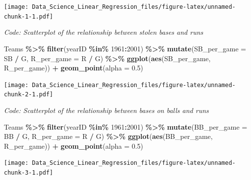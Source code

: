 \documentclass[
]{article}
\newenvironment{Shaded}{\begin{snugshade}}{\end{snugshade}}
\newcommand{\DataTypeTok}[1]{\textcolor[rgb]{0.13,0.29,0.53}{#1}}
\newcommand{\DecValTok}[1]{\textcolor[rgb]{0.00,0.00,0.81}{#1}}
\newcommand{\FloatTok}[1]{\textcolor[rgb]{0.00,0.00,0.81}{#1}}
\newcommand{\KeywordTok}[1]{\textcolor[rgb]{0.13,0.29,0.53}{\textbf{#1}}}
\newcommand{\NormalTok}[1]{#1}
\newcommand{\OperatorTok}[1]{\textcolor[rgb]{0.81,0.36,0.00}{\textbf{#1}}}
\newcommand{\StringTok}[1]{\textcolor[rgb]{0.31,0.60,0.02}{#1}}
\begin{document}
\texttt{[image: Data\_Science\_Linear\_Regression\_files/figure-latex/unnamed-chunk-1-1.pdf]}

\emph{Code: Scatterplot of the relationship between stolen bases and
runs}

\begin{Shaded}
\begin{Highlighting}[]
\NormalTok{Teams }\OperatorTok{\%\textgreater{}\%}\StringTok{ }\KeywordTok{filter}\NormalTok{(yearID }\OperatorTok{\%in\%}\StringTok{ }\DecValTok{1961}\OperatorTok{:}\DecValTok{2001}\NormalTok{) }\OperatorTok{\%\textgreater{}\%}
\StringTok{    }\KeywordTok{mutate}\NormalTok{(}\DataTypeTok{SB\_per\_game =}\NormalTok{ SB }\OperatorTok{/}\StringTok{ }\NormalTok{G, }\DataTypeTok{R\_per\_game =}\NormalTok{ R }\OperatorTok{/}\StringTok{ }\NormalTok{G) }\OperatorTok{\%\textgreater{}\%}
\StringTok{    }\KeywordTok{ggplot}\NormalTok{(}\KeywordTok{aes}\NormalTok{(SB\_per\_game, R\_per\_game)) }\OperatorTok{+}\StringTok{ }
\StringTok{    }\KeywordTok{geom\_point}\NormalTok{(}\DataTypeTok{alpha =} \FloatTok{0.5}\NormalTok{)}
\end{Highlighting}
\end{Shaded}

\texttt{[image: Data\_Science\_Linear\_Regression\_files/figure-latex/unnamed-chunk-2-1.pdf]}

\emph{Code: Scatterplot of the relationship between bases on balls and
runs}

\begin{Shaded}
\begin{Highlighting}[]
\NormalTok{Teams }\OperatorTok{\%\textgreater{}\%}\StringTok{ }\KeywordTok{filter}\NormalTok{(yearID }\OperatorTok{\%in\%}\StringTok{ }\DecValTok{1961}\OperatorTok{:}\DecValTok{2001}\NormalTok{) }\OperatorTok{\%\textgreater{}\%}
\StringTok{    }\KeywordTok{mutate}\NormalTok{(}\DataTypeTok{BB\_per\_game =}\NormalTok{ BB }\OperatorTok{/}\StringTok{ }\NormalTok{G, }\DataTypeTok{R\_per\_game =}\NormalTok{ R }\OperatorTok{/}\StringTok{ }\NormalTok{G) }\OperatorTok{\%\textgreater{}\%}
\StringTok{    }\KeywordTok{ggplot}\NormalTok{(}\KeywordTok{aes}\NormalTok{(BB\_per\_game, R\_per\_game)) }\OperatorTok{+}\StringTok{ }
\StringTok{    }\KeywordTok{geom\_point}\NormalTok{(}\DataTypeTok{alpha =} \FloatTok{0.5}\NormalTok{)}
\end{Highlighting}
\end{Shaded}

\texttt{[image: Data\_Science\_Linear\_Regression\_files/figure-latex/unnamed-chunk-3-1.pdf]}
\end{document}
